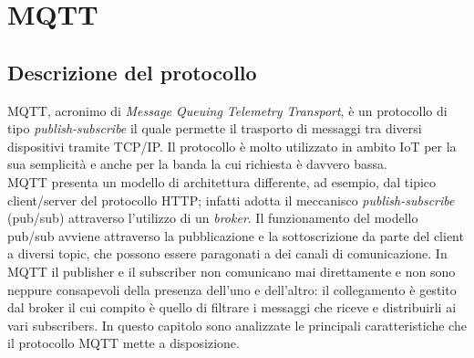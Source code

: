 \documentclass[binding=0.6cm,TFA]{sapthesis}
\begin{document}
\chapter{MQTT}

\begin{large}

\section{Descrizione del protocollo}

MQTT, acronimo di \textit{Message Queuing Telemetry Transport}, è un protocollo di tipo \textit{publish-subscribe} il quale permette il trasporto di messaggi tra diversi dispositivi tramite TCP/IP. Il protocollo è molto utilizzato in ambito IoT per la sua semplicità e anche per la banda la cui richiesta è davvero bassa. \\

MQTT presenta un modello di architettura differente, ad esempio, dal tipico client/server del protocollo HTTP; infatti adotta il meccanisco \textit{publish-subscribe} (pub/sub) attraverso l'utilizzo di un \textit{broker}. Il funzionamento del modello pub/sub avviene attraverso la pubblicazione e la sottoscrizione da parte del client a diversi topic, che possono essere paragonati a dei canali di comunicazione. In MQTT il publisher e il subscriber non comunicano mai direttamente e non sono neppure consapevoli della presenza dell'uno e dell'altro: il collegamento è gestito dal broker il cui compito è quello di filtrare i messaggi che riceve e distribuirli ai vari subscribers. 
In questo capitolo sono analizzate le principali caratteristiche che il protocollo MQTT mette a disposizione.


\end{large}
\end{document}

